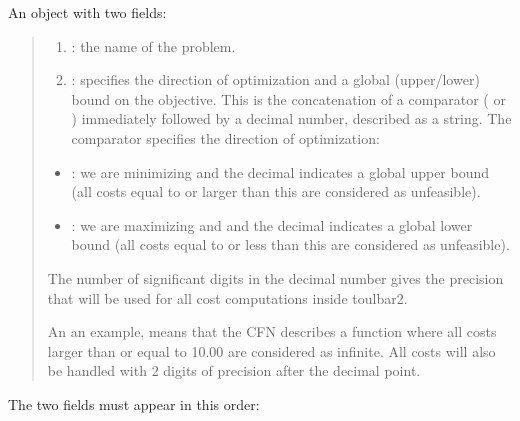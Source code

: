 \documentclass[letterpaper,10pt,openany,oneside,english]{sphinxmanual}
\begin{document}
\sphinxAtStartPar
An object with two fields:
\begin{quote}
\begin{enumerate}
%
\item {} 
\sphinxAtStartPar
{} : the name of the problem.

\item {} 
\sphinxAtStartPar
{} : specifies the direction of optimization and a global (upper/lower) bound on the objective. This is the concatenation of a comparator (\sphinxcode{\sphinxupquote{\textgreater{}}} or \sphinxcode{\sphinxupquote{\textless{}}}) immediately followed by a decimal number, described as a string. The comparator specifies the direction of optimization:

\end{enumerate}
\begin{itemize}
\item {} 
\sphinxAtStartPar
{}: we are minimizing and the decimal indicates a global upper bound (all costs equal to or larger than this are considered as unfeasible).

\item {} 
\sphinxAtStartPar
{}: we are maximizing and and the decimal indicates a global lower bound (all costs equal to or less than this are considered as unfeasible).

\end{itemize}

\sphinxAtStartPar
The number of significant digits in the decimal number gives the precision that will be used for all cost computations inside toulbar2.

\sphinxAtStartPar
An an example,  means that the CFN describes a function where all costs larger than or equal to 10.00 are considered as infinite. All costs will also be handled with 2 digits of precision after the decimal point.
\end{quote}

\sphinxAtStartPar
The two fields must appear in this order:

\begin{sphinxVerbatim}[commandchars=\\\{\}]
     
\end{sphinxVerbatim}
\end{document}

